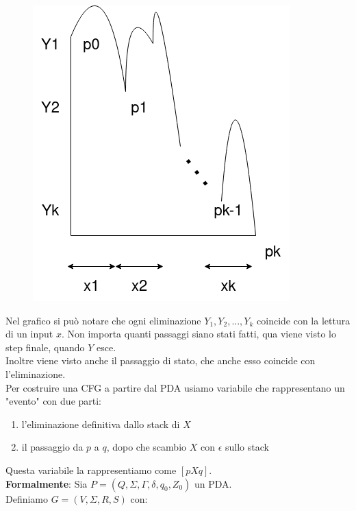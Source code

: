 \documentclass[12pt]{article}
\begin{document}
\begin{figure}[ht]
	\includegraphics[scale = 0.4]{media/grafico_pda.png}
	\centering
\end{figure}
Nel grafico si può notare che ogni eliminazione $Y_1,Y_2,...,Y_k$ coincide con la lettura di un input $x$. Non importa quanti passaggi siano stati fatti, qua viene visto lo step finale, quando $Y$ esce.
\\ Inoltre viene visto anche il passaggio di stato, che anche esso coincide con l'eliminazione.
\\ Per costruire una CFG a partire dal PDA usiamo variabile che rappresentano un "evento" con due parti: 
\begin{enumerate}
  \item l'eliminazione definitiva dallo stack di $X$
  \item il passaggio da $p$ a $q$, dopo che scambio $X$ con $\epsilon$ sullo stack
\end{enumerate}
Questa variabile la rappresentiamo come $[pXq]$. 
\\ \textbf{Formalmente}: Sia $P=(Q,\Sigma,\Gamma, \delta,q_0,Z_0)$ un PDA. \\ Definiamo $G=(V,\Sigma,R,S)$ con:
\end{document}
